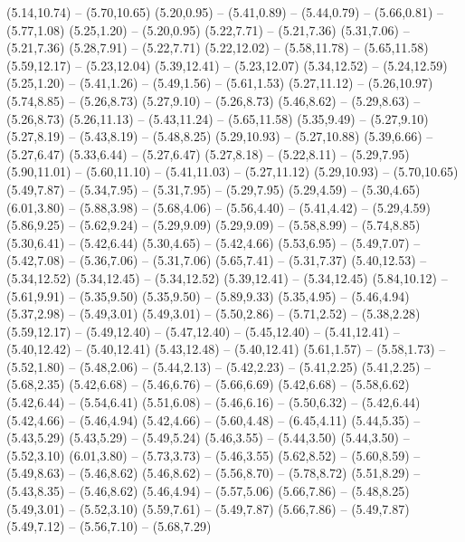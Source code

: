 {  (5.14,10.74) -- (5.70,10.65)
  (5.20,0.95) -- (5.41,0.89) -- (5.44,0.79) -- (5.66,0.81) -- (5.77,1.08)
  (5.25,1.20) -- (5.20,0.95)
  (5.22,7.71) -- (5.21,7.36)
  (5.31,7.06) -- (5.21,7.36)
  (5.28,7.91) -- (5.22,7.71)
  (5.22,12.02) -- (5.58,11.78) -- (5.65,11.58)
  (5.59,12.17) -- (5.23,12.04)
  (5.39,12.41) -- (5.23,12.07)
  (5.34,12.52) -- (5.24,12.59)
  (5.25,1.20) -- (5.41,1.26) -- (5.49,1.56) -- (5.61,1.53)
  (5.27,11.12) -- (5.26,10.97)
  (5.74,8.85) -- (5.26,8.73)
  (5.27,9.10) -- (5.26,8.73)
  (5.46,8.62) -- (5.29,8.63) -- (5.26,8.73)
  (5.26,11.13) -- (5.43,11.24) -- (5.65,11.58)
  (5.35,9.49) -- (5.27,9.10)
  (5.27,8.19) -- (5.43,8.19) -- (5.48,8.25)
  (5.29,10.93) -- (5.27,10.88)
  (5.39,6.66) -- (5.27,6.47)
  (5.33,6.44) -- (5.27,6.47)
  (5.27,8.18) -- (5.22,8.11) -- (5.29,7.95)
  (5.90,11.01) -- (5.60,11.10) -- (5.41,11.03) -- (5.27,11.12)
  (5.29,10.93) -- (5.70,10.65)
  (5.49,7.87) -- (5.34,7.95) -- (5.31,7.95) -- (5.29,7.95)
  (5.29,4.59) -- (5.30,4.65)
  (6.01,3.80) -- (5.88,3.98) -- (5.68,4.06) -- (5.56,4.40) -- (5.41,4.42) -- (5.29,4.59)
  (5.86,9.25) -- (5.62,9.24) -- (5.29,9.09)
  (5.29,9.09) -- (5.58,8.99) -- (5.74,8.85)
  (5.30,6.41) -- (5.42,6.44)
  (5.30,4.65) -- (5.42,4.66)
  (5.53,6.95) -- (5.49,7.07) -- (5.42,7.08) -- (5.36,7.06) -- (5.31,7.06)
  (5.65,7.41) -- (5.31,7.37)
  (5.40,12.53) -- (5.34,12.52)
  (5.34,12.45) -- (5.34,12.52)
  (5.39,12.41) -- (5.34,12.45)
  (5.84,10.12) -- (5.61,9.91) -- (5.35,9.50)
  (5.35,9.50) -- (5.89,9.33)
  (5.35,4.95) -- (5.46,4.94)
  (5.37,2.98) -- (5.49,3.01)
  (5.49,3.01) -- (5.50,2.86) -- (5.71,2.52) -- (5.38,2.28)
  (5.59,12.17) -- (5.49,12.40) -- (5.47,12.40) -- (5.45,12.40) -- (5.41,12.41) -- (5.40,12.42) -- (5.40,12.41)
  (5.43,12.48) -- (5.40,12.41)
  (5.61,1.57) -- (5.58,1.73) -- (5.52,1.80) -- (5.48,2.06) -- (5.44,2.13) -- (5.42,2.23) -- (5.41,2.25)
  (5.41,2.25) -- (5.68,2.35)
  (5.42,6.68) -- (5.46,6.76) -- (5.66,6.69)
  (5.42,6.68) -- (5.58,6.62)
  (5.42,6.44) -- (5.54,6.41)
  (5.51,6.08) -- (5.46,6.16) -- (5.50,6.32) -- (5.42,6.44)
  (5.42,4.66) -- (5.46,4.94)
  (5.42,4.66) -- (5.60,4.48) -- (6.45,4.11)
  (5.44,5.35) -- (5.43,5.29)
  (5.43,5.29) -- (5.49,5.24)
  (5.46,3.55) -- (5.44,3.50)
  (5.44,3.50) -- (5.52,3.10)
  (6.01,3.80) -- (5.73,3.73) -- (5.46,3.55)
  (5.62,8.52) -- (5.60,8.59) -- (5.49,8.63) -- (5.46,8.62)
  (5.46,8.62) -- (5.56,8.70) -- (5.78,8.72)
  (5.51,8.29) -- (5.43,8.35) -- (5.46,8.62)
  (5.46,4.94) -- (5.57,5.06)
  (5.66,7.86) -- (5.48,8.25)
  (5.49,3.01) -- (5.52,3.10)
  (5.59,7.61) -- (5.49,7.87)
  (5.66,7.86) -- (5.49,7.87)
  (5.49,7.12) -- (5.56,7.10) -- (5.68,7.29)
}
